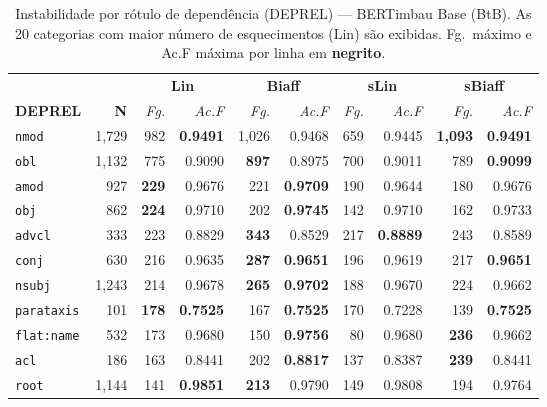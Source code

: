 \clearpage
\begin{table}[p]
\centering
\caption{Instabilidade por r\'otulo de depend\^encia (DEPREL) --- BERTimbau Base (BtB).
As 20 categorias com maior n\'umero de esquecimentos (Lin) s\~ao exibidas.
Fg.\ m\'aximo e Ac.F m\'axima por linha em \textbf{negrito}.}
\label{tab:instab-btb-deprel}
\begingroup
\scriptsize\setlength{\tabcolsep}{2pt}\renewcommand{\arraystretch}{1.25}%
\begin{tabular}{l r| r r| r r| r r| r r}
\toprule
\multicolumn{2}{c|}{}
  & \multicolumn{2}{c|}{\textbf{Lin}}
  & \multicolumn{2}{c|}{\textbf{Biaff}}
  & \multicolumn{2}{c|}{\textbf{sLin}}
  & \multicolumn{2}{c}{\textbf{sBiaff}} \\
\textbf{DEPREL} & \textbf{N}
  & \textit{Fg.} & \textit{Ac.F}
  & \textit{Fg.} & \textit{Ac.F}
  & \textit{Fg.} & \textit{Ac.F}
  & \textit{Fg.} & \textit{Ac.F} \\
\cmidrule(lr){3-4}\cmidrule(lr){5-6}\cmidrule(lr){7-8}\cmidrule(lr){9-10}
  \texttt{nmod} & 1,729 & 982 & \textbf{0.9491} & 1,026 & 0.9468 & 659 & 0.9445 & \textbf{1,093} & \textbf{0.9491} \\
  \texttt{obl} & 1,132 & 775 & 0.9090 & \textbf{897} & 0.8975 & 700 & 0.9011 & 789 & \textbf{0.9099} \\
  \texttt{amod} & 927 & \textbf{229} & 0.9676 & 221 & \textbf{0.9709} & 190 & 0.9644 & 180 & 0.9676 \\
  \texttt{obj} & 862 & \textbf{224} & 0.9710 & 202 & \textbf{0.9745} & 142 & 0.9710 & 162 & 0.9733 \\
  \texttt{advcl} & 333 & 223 & 0.8829 & \textbf{343} & 0.8529 & 217 & \textbf{0.8889} & 243 & 0.8589 \\
  \texttt{conj} & 630 & 216 & 0.9635 & \textbf{287} & \textbf{0.9651} & 196 & 0.9619 & 217 & \textbf{0.9651} \\
  \texttt{nsubj} & 1,243 & 214 & 0.9678 & \textbf{265} & \textbf{0.9702} & 188 & 0.9670 & 224 & 0.9662 \\
  \texttt{parataxis} & 101 & \textbf{178} & \textbf{0.7525} & 167 & \textbf{0.7525} & 170 & 0.7228 & 139 & \textbf{0.7525} \\
  \texttt{flat\!:\!name} & 532 & 173 & 0.9680 & 150 & \textbf{0.9756} & 80 & 0.9680 & \textbf{236} & 0.9662 \\
  \texttt{acl} & 186 & 163 & 0.8441 & 202 & \textbf{0.8817} & 137 & 0.8387 & \textbf{239} & 0.8441 \\
  \texttt{root} & 1,144 & 141 & \textbf{0.9851} & \textbf{213} & 0.9790 & 149 & 0.9808 & 194 & 0.9764 \\

\end{tabular}
\end{table}
